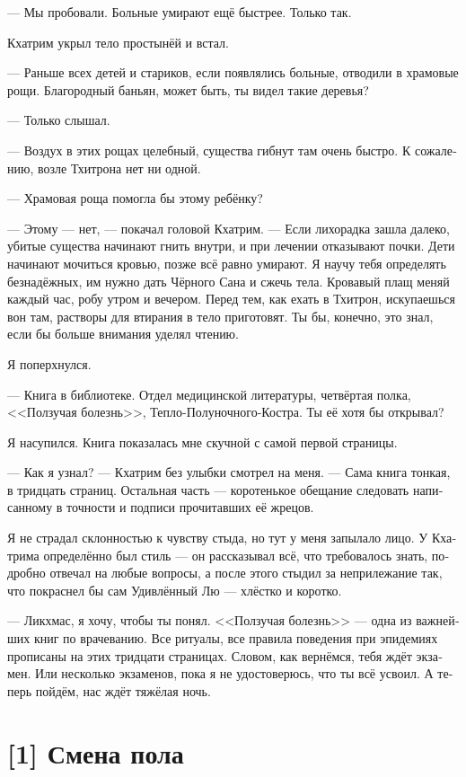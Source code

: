 \documentclass[a4paper,12pt,fleqn]{book}\usepackage{polyglossia}\setdefaultlanguage[babelshorthands=true]{russian}\setotherlanguage{english}\defaultfontfeatures{Ligatures=TeX,Mapping=tex-text}\usepackage{xcolor}\newcommand{\ml}[3]{#2}
\begin{document}
{--- Мы пробовали.
Больные умирают ещё быстрее.
Только так.

Кхатрим укрыл тело простынёй и встал.

--- Раньше всех детей и стариков, если появлялись больные, отводили в храмовые рощи.
Благородный баньян, может быть, ты видел такие деревья?

--- Только слышал.

--- Воздух в этих рощах целебный, существа гибнут там очень быстро.
К сожалению, возле Тхитрона нет ни одной.

--- Храмовая роща помогла бы этому ребёнку?

--- Этому --- нет, --- покачал головой Кхатрим.
--- Если лихорадка зашла далеко, убитые существа начинают гнить внутри, и при лечении отказывают почки.
Дети начинают мочиться кровью, позже всё равно умирают.
Я научу тебя определять безнадёжных, им нужно дать Чёрного Сана и сжечь тела.
Кровавый плащ меняй каждый час, робу утром и вечером.
Перед тем, как ехать в Тхитрон, искупаешься вон там, растворы для втирания в тело приготовят.
Ты бы, конечно, это знал, если бы больше внимания уделял чтению.

Я поперхнулся.

--- Книга в библиотеке.
Отдел медицинской литературы, четвёртая полка, <<Ползучая болезнь>>, Тепло-Полуночного-Костра.
Ты её хотя бы открывал?

Я насупился.
Книга показалась мне скучной с самой первой страницы.

--- Как я узнал? --- Кхатрим без улыбки смотрел на меня.
--- Сама книга тонкая, в тридцать страниц.
Остальная часть --- коротенькое обещание следовать написанному в точности и подписи прочитавших её жрецов.

Я не страдал склонностью к чувству стыда, но тут у меня запылало лицо.
У Кхатрима определённо был стиль --- он рассказывал всё, что требовалось знать, подробно отвечал на любые вопросы, а после этого стыдил за неприлежание так, что покраснел бы сам Удивлённый Лю --- хлёстко и коротко.

--- Ликхмас, я хочу, чтобы ты понял.
<<Ползучая болезнь>> --- одна из важнейших книг по врачеванию.
Все ритуалы, все правила поведения при эпидемиях прописаны на этих тридцати страницах.
Словом, как вернёмся, тебя ждёт экзамен.
Или несколько экзаменов, пока я не удостоверюсь, что ты всё усвоил.
А теперь пойдём, нас ждёт тяжёлая ночь.

\section{[1] Смена пола}

}
\end{document}
